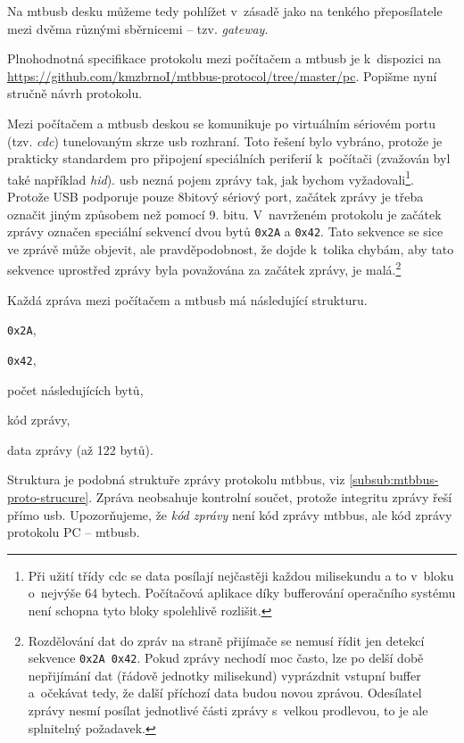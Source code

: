 Na \gls{mtbusb} desku můžeme tedy pohlížet v~zásadě jako na tenkého
přeposílatele mezi dvěma různými sběrnicemi – tzv. \textit{gateway}.

Plnohodnotná specifikace protokolu mezi počítačem a \gls{mtbusb} je
k~dispozici na \url{https://github.com/kmzbrnoI/mtbbus-protocol/tree/master/pc}.
Popišme nyní stručně návrh protokolu.

Mezi počítačem a \gls{mtbusb} deskou se komunikuje po virtuálním sériovém portu
(tzv. \textit{\gls{cdc}}) tunelovaným skrze \gls{usb} rozhraní. Toto řešení
bylo vybráno, protože je prakticky standardem pro připojení speciálních
periferií k~počítači (zvažován byl také například \textit{\gls{hid}}).
\gls{usb} nezná pojem zprávy tak, jak bychom
vyžadovali\footnote{Při užití třídy \gls{cdc} se data posílají nejčastěji
každou milisekundu a to v~bloku o~nejvýše 64 bytech.  Počítačová aplikace díky
bufferování operačního systému není schopna tyto bloky spolehlivě rozlišit.}.
Protože USB podporuje pouze 8bitový sériový port, začátek zprávy je třeba
označit jiným způsobem než pomocí 9. bitu. V~navrženém protokolu je začátek
zprávy označen speciální sekvencí dvou bytů \texttt{0x2A} a \texttt{0x42}. Tato sekvence
se sice ve zprávě může objevit, ale pravděpodobnost, že dojde k~tolika chybám,
aby tato sekvence uprostřed zprávy byla považována za začátek zprávy, je
malá.\footnote{Rozdělování dat do zpráv na straně přijímače se
nemusí řídit jen detekcí sekvence \texttt{0x2A 0x42}. Pokud zprávy nechodí moc
často, lze po delší době nepřijímání dat (řádově jednotky milisekund) vyprázdnit
vstupní buffer a~očekávat tedy, že další příchozí data budou novou zprávou.
Odesílatel zprávy nesmí posílat jednotlivé části zprávy s~velkou prodlevou, to
je ale splnitelný požadavek.}

Každá zpráva mezi počítačem a \gls{mtbusb} má následující strukturu.

\begin{compactenum}
\item \texttt{0x2A},
\item \texttt{0x42},
\item počet následujících bytů,
\item kód zprávy,
\item data zprávy (až 122 bytů).
\end{compactenum}

Struktura je podobná struktuře zprávy protokolu \gls{mtbbus}, viz
\ref{subsub:mtbbus-proto-strucure}. Zpráva neobsahuje kontrolní součet, protože
integritu zprávy řeší přímo \gls{usb}.
Upozorňujeme, že \textit{kód zprávy} není kód zprávy \gls{mtbbus},
ale kód zprávy protokolu PC – \gls{mtbusb}.

